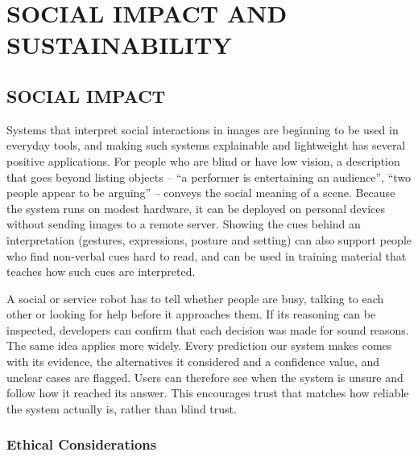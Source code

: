 
\chapter{SOCIAL IMPACT AND SUSTAINABILITY}
\label{ch:impact}

\section{SOCIAL IMPACT}

Systems that interpret social interactions in images are beginning to be used in everyday tools, and making such systems explainable and lightweight has several positive applications. For people who are blind or have low vision, a description that goes beyond listing objects -- ``a performer is entertaining an audience'', ``two people appear to be arguing'' -- conveys the social meaning of a scene. Because the system runs on modest hardware, it can be deployed on personal devices without sending images to a remote server. Showing the cues behind an interpretation (gestures, expressions, posture and setting) can also support people who find non-verbal cues hard to read, and can be used in training material that teaches how such cues are interpreted.

A social or service robot has to tell whether people are busy, talking to each other or looking for help before it approaches them. If its reasoning can be inspected, developers can confirm that each decision was made for sound reasons. The same idea applies more widely. Every prediction our system makes comes with its evidence, the alternatives it considered and a confidence value, and unclear cases are flagged. Users can therefore see when the system is unsure and follow how it reached its answer. This encourages trust that matches how reliable the system actually is, rather than blind trust.

\subsection{Ethical Considerations}


